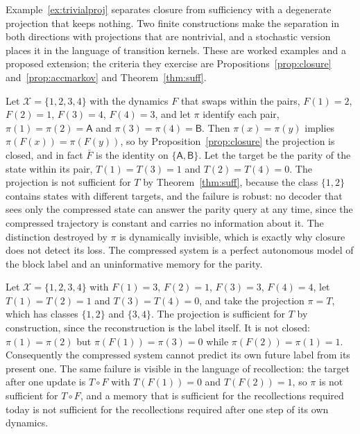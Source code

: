 Example~\ref{ex:trivialproj} separates closure from sufficiency with a degenerate projection that keeps nothing. Two finite constructions make the separation in both directions with projections that are nontrivial, and a stochastic version places it in the language of transition kernels. These are worked examples and a proposed extension; the criteria they exercise are Propositions~\ref{prop:closure} and~\ref{prop:accmarkov} and Theorem~\ref{thm:suff}.

\begin{counterex}\label{cex:closedinsuff}
Let $\mathcal X=\{1,2,3,4\}$ with the dynamics $F$ that swaps within the pairs, $F(1)=2$, $F(2)=1$, $F(3)=4$, $F(4)=3$, and let $\pi$ identify each pair, $\pi(1)=\pi(2)=\mathsf A$ and $\pi(3)=\pi(4)=\mathsf B$. Then $\pi(x)=\pi(y)$ implies $\pi(F(x))=\pi(F(y))$, so by Proposition~\ref{prop:closure} the projection is closed, and in fact $\bar F$ is the identity on $\{\mathsf A,\mathsf B\}$. Let the target be the parity of the state within its pair, $T(1)=T(3)=1$ and $T(2)=T(4)=0$. The projection is not sufficient for $T$ by Theorem~\ref{thm:suff}, because the class $\{1,2\}$ contains states with different targets, and the failure is robust: no decoder that sees only the compressed state can answer the parity query at any time, since the compressed trajectory is constant and carries no information about it. The distinction destroyed by $\pi$ is dynamically invisible, which is exactly why closure does not detect its loss. The compressed system is a perfect autonomous model of the block label and an uninformative memory for the parity.
\end{counterex}

\begin{counterex}\label{cex:sufficientnotclosed}
Let $\mathcal X=\{1,2,3,4\}$ with $F(1)=3$, $F(2)=1$, $F(3)=3$, $F(4)=4$, let $T(1)=T(2)=1$ and $T(3)=T(4)=0$, and take the projection $\pi=T$, which has classes $\{1,2\}$ and $\{3,4\}$. The projection is sufficient for $T$ by construction, since the reconstruction is the label itself. It is not closed: $\pi(1)=\pi(2)$ but $\pi(F(1))=\pi(3)=0$ while $\pi(F(2))=\pi(1)=1$. Consequently the compressed system cannot predict its own future label from its present one. The same failure is visible in the language of recollection: the target after one update is $T\circ F$ with $T(F(1))=0$ and $T(F(2))=1$, so $\pi$ is not sufficient for $T\circ F$, and a memory that is sufficient for the recollections required today is not sufficient for the recollections required after one step of its own dynamics.
\end{counterex}

